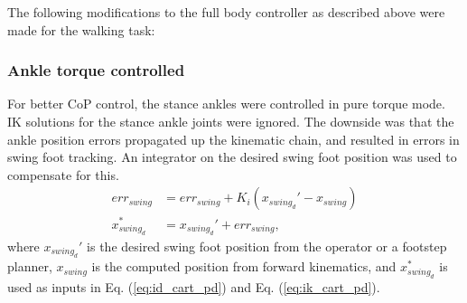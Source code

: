 \documentclass{ws-ijhr}
\newcommand{\eref}[1] {Eq. (\ref{#1})}
\begin{document}
The following modifications to the full body controller as described above were
made for the walking task:
\subsubsection{Ankle torque controlled}
For better CoP control, the stance ankles were controlled in pure torque mode. 
IK solutions for the stance ankle joints were ignored. 
The downside was that the ankle position errors propagated up the kinematic 
chain, and resulted in errors in swing foot tracking. 
An integrator on the desired swing foot position was used to compensate for this. 
\begin{equation}
  \label{eq:int}
  \begin{split}
    err_{swing} &= err_{swing} + K_i(x_{swing_d}' - x_{swing}) \\
    x_{swing_d}^* &= x_{swing_d}' + err_{swing},
  \end{split}
\end{equation}  
where $x_{swing_d}'$ is the desired swing foot position from the operator or a 
footstep planner, 
$x_{swing}$ is the computed position from forward kinematics, 
and $x_{swing_d}^*$ is used as inputs in \eref{eq:id_cart_pd} and 
\eref{eq:ik_cart_pd}. 
\end{document}
